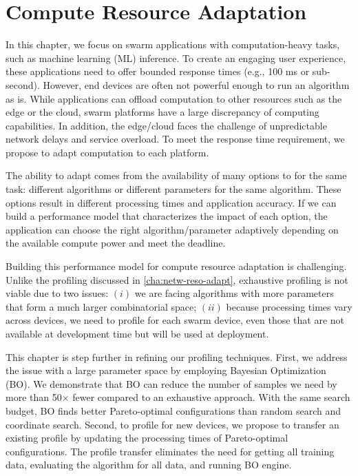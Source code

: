 \documentclass[thesis.tex]{subfiles}
\begin{document}
\chapter{Compute Resource Adaptation}
\label{cha:comp-reso-adapt}

In this chapter, we focus on swarm applications with computation-heavy tasks,
such as machine learning (ML) inference. To create an engaging user experience,
these applications need to offer bounded response times (e.g., 100 ms or
sub-second). However, end devices are often not powerful enough to run an
algorithm as is. While applications can offload computation to other resources
such as the edge or the cloud, swarm platforms have a large discrepancy of
computing capabilities. In addition, the edge/cloud faces the challenge of
unpredictable network delays and service overload. To meet the response time
requirement, we propose to adapt computation to each platform.

The ability to adapt comes from the availability of many options to for the same
task: different algorithms or different parameters for the same algorithm. These
options result in different processing times and application accuracy. If we can
build a performance model that characterizes the impact of each option, the
application can choose the right algorithm/parameter adaptively depending on the
available compute power and meet the deadline.

Building this performance model for compute resource adaptation is
challenging. Unlike the profiling discussed in \autoref{cha:netw-reso-adapt},
exhaustive profiling is not viable due to two issues: $(i)$ we are facing
algorithms with more parameters that form a much larger combinatorial space;
$(ii)$ because processing times vary across devices, we need to profile for each
swarm device, even those that are not available at development time but will be
used at deployment.

This chapter is step further in refining our profiling techniques. First, we
address the issue with a large parameter space by employing Bayesian
Optimization (BO). We demonstrate that BO can reduce the number of samples we
need by more than 50$\times$ fewer compared to an exhaustive approach. With the
same search budget, BO finds better Pareto-optimal configurations than random
search and coordinate search. Second, to profile for new devices, we propose to
transfer an existing profile by updating the processing times of Pareto-optimal
configurations. The profile transfer eliminates the need for getting all
training data, evaluating the algorithm for all data, and running BO engine.






\end{document}
